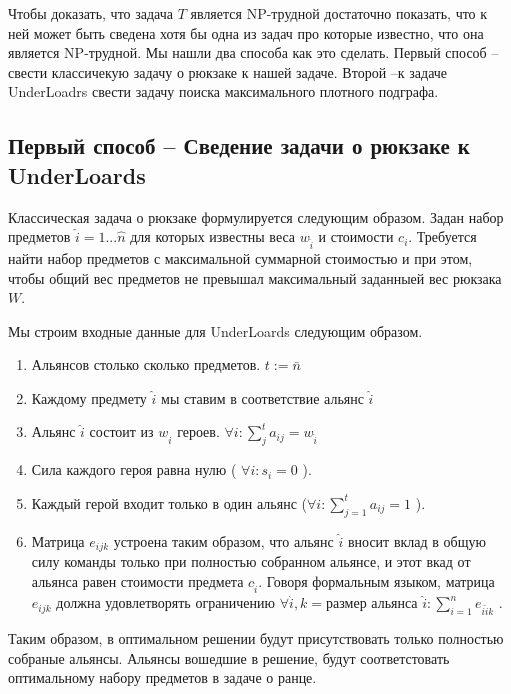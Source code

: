 \documentclass{article}
\begin{document}
Чтобы доказать, что задача $T$ является NP-трудной достаточно показать, что  к ней может быть сведена хотя бы одна из задач про которые известно, что она является NP-трудной.  Мы нашли два способа как это сделать. Первый способ – свести классичекую задачу о рюкзаке к нашей задаче. Второй –к задаче UnderLoadrs  свести задачу поиска максимального плотного подграфа. 


\subsection{Первый способ – Сведение задачи о рюкзаке к UnderLoards}

Классическая задача о рюкзаке формулируется следующим образом. Задан набор предметов $\hat{i}=1...\hat{n}$ для которых известны веса $w_{\hat{i}}$ и стоимости $c_i$. Требуется найти набор предметов с максимальной суммарной стоимостью и при этом, чтобы общий вес предметов не превышал максимальный заданныей вес рюкзака $W$.



Мы строим входные данные для UnderLoards следующим образом. 



\begin{enumerate}
\item Альянсов столько сколько предметов. $t:=\bar{n}$
\item Каждому предмету $\hat{i}$ мы ставим в соответствие альянс $\hat{i}$
\item Альянс $\hat{i}$ состоит из $w_{\hat{i}}$ героев. $\forall i : \sum_j^t{a_{ij} } = w_{\hat{i}}  $
\item Сила каждого героя равна нулю ( $\forall i : s_i = 0 $ ). 
\item Каждый герой входит только в один альянс ($\forall i : \sum_{j=1}^t {a_{ij}} =1 $ ).
\item Матрица $e_{ijk}$ устроена таким образом, что альянс $\hat{i}$  вносит вклад в общую силу команды только при полностью собранном альянсе, и этот вкад от альянса равен стоимости предмета  $c_{\hat{i}}$. Говоря формальным языком, матрица $e_{ijk}$ должна удовлетворять ограничению $ \forall \hat{i}, k = \textit{размер альянса }\hat{i} : \sum_{i=1}^n {e_{i \hat{i}k } } $ . 
\end{enumerate}


Таким образом, в оптимальном решении будут присутствовать только полностью собраные альянсы. Альянсы вошедшие в решение, будут соответстовать оптимальному набору предметов в задаче о ранце.
\end{document}

